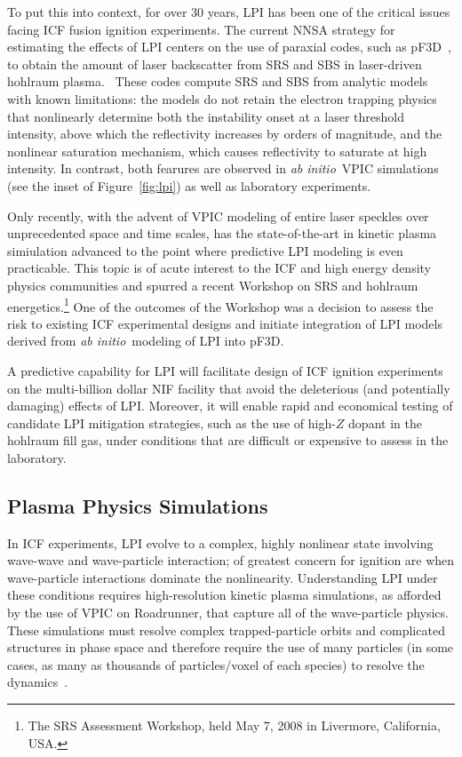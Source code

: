 \documentclass[journal,twoside]{IEEEtran}
\newcommand{\fig}[1]{Figure~\ref{fig:#1}}
\newcommand{\abinitio} {\textit{ab initio}}
\begin{document}
To put this into context, for over 30 years, LPI has been one of
the critical issues facing ICF fusion ignition experiments.  
The current NNSA strategy for estimating the effects of LPI
centers on the use of paraxial codes, 
such as pF3D~\cite{Berger_Phys_Plasmas_1998}, 
to obtain the amount of laser backscatter from SRS and 
SBS in laser-driven hohlraum plasma.~\cite{Glenzer_Nature_Physics_2007,
Labaune_Nature_Physics_2007}
These codes compute SRS and SBS from
analytic models with known limitations: the models 
do not retain the electron trapping physics that nonlinearly determine both
the instability onset at a laser threshold intensity, above which the 
reflectivity increases by orders of magnitude, and the nonlinear saturation 
mechanism, which causes reflectivity to saturate
at high intensity.  In contrast, both fearures are observed in \abinitio\ VPIC 
simulations (see the inset of \fig{lpi}) 
as well as laboratory experiments.~\cite{Montgomery_et_al_Phys_Plasmas_2002}  

Only recently, with the advent of VPIC modeling of entire laser speckles over 
unprecedented space and time scales, has the state-of-the-art in kinetic 
plasma simiulation advanced to the point where predictive LPI modeling 
is even practicable.  This topic is of acute interest 
to the ICF and high energy density physics communities and spurred a recent 
Workshop on SRS and hohlraum energetics.\footnote{The SRS Assessment Workshop, 
held May 7, 2008 in Livermore, California, USA.}  
One of the outcomes of the Workshop was a decision to assess the 
risk to existing ICF experimental designs and initiate integration of 
LPI models derived from \abinitio\ modeling of LPI into pF3D.  

A predictive capability for LPI will facilitate design of ICF ignition experiments 
on the multi-billion dollar NIF facility that avoid the deleterious (and potentially
damaging) effects of LPI. Moreover, it will enable 
rapid and economical testing of candidate LPI mitigation strategies, such as the 
use of high-$Z$ dopant in the hohlraum fill gas, under conditions that are difficult or
expensive to assess in the laboratory.  


\subsection{Plasma Physics Simulations}

In ICF experiments, LPI evolve to a complex, highly nonlinear state
involving wave-wave and wave-particle interaction; of greatest concern
for ignition are when wave-particle interactions dominate the
nonlinearity.  Understanding LPI under these conditions requires
high-resolution kinetic plasma simulations, as afforded by the use of
VPIC on Roadrunner, that capture all of the wave-particle physics.
These simulations must resolve complex trapped-particle orbits and
complicated structures in phase space and therefore require the use of
many particles (in some cases, as many as thousands of particles/voxel
of each species) to resolve the
dynamics~\cite{Yin_et_al_Phys_Plasmas_2006}.
\end{document}
